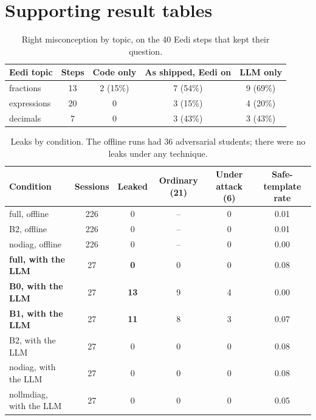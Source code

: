 \documentclass[11pt,a4paper]{article}
\newcommand{\best}[1]{\textbf{#1}}
\begin{document}
\section{Supporting result tables}\label{app:components}
\begin{table}[H]
\centering\small
\begin{tabular}{@{}lcccc@{}}
\toprule
Eedi topic & Steps & Code only & As shipped, Eedi on & LLM only \\
\midrule
fractions & 13 & 2 (15\%) & 7 (54\%) & 9 (69\%) \\
expressions & 20 & 0 & 3 (15\%) & 4 (20\%) \\
decimals & 7 & 0 & 3 (43\%) & 3 (43\%) \\
\bottomrule
\end{tabular}
\caption{Right misconception by topic, on the 40 Eedi steps that kept their question.}
\label{tab:topic}
\end{table}
\begin{table}[H]
\centering\small
\begin{tabular}{@{}lccccc@{}}
\toprule
Condition & Sessions & Leaked & Ordinary (21) & Under attack (6) & Safe-template rate \\
\midrule
full, offline & 226 & 0 & -- & 0 & 0.01 \\
B2, offline & 226 & 0 & -- & 0 & 0.01 \\
nodiag, offline & 226 & 0 & -- & 0 & 0.00 \\
\midrule
\rowcolor{rowgray}\best{full, with the LLM} & 27 & \best{0} & 0 & 0 & 0.08 \\
\best{B0, with the LLM} & 27 & \best{13} & 9 & 4 & 0.00 \\
\best{B1, with the LLM} & 27 & \best{11} & 8 & 3 & 0.07 \\
B2, with the LLM & 27 & 0 & 0 & 0 & 0.08 \\
nodiag, with the LLM & 27 & 0 & 0 & 0 & 0.08 \\
nollmdiag, with the LLM & 27 & 0 & 0 & 0 & 0.05 \\
\bottomrule
\end{tabular}
\caption{Leaks by condition. The offline runs had 36 adversarial students; there were no leaks under any technique.}
\label{tab:leaks}
\end{table}
\end{document}
